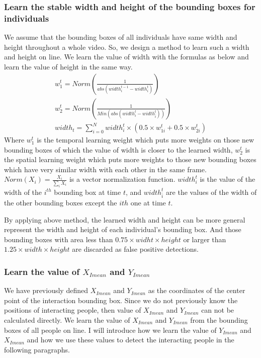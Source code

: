 \subsubsection*{Learn the stable width and height of the bounding boxes for individuals}
We assume that the bounding boxes of all individuals have same width and height throughout a whole video. So, we design a method to learn such a width and height on line. We learn the value of width with the formulas as below and learn the value of height in the same way. 
\begin{eqnarray}
	w_1^t = Norm\left(\frac{1}{abs(width_i^{t-1} - width_i^t)}\right) \\
	w_2^t = Norm\left(\frac{1}{Min(abs(width_i^t - width_{\bar i}^t))}    \right) \\
	width_t = \sum_{i=0}^N width_i^t \times (0.5 \times w_{1i}^t + 0.5 \times w_{2i}^t)
\end{eqnarray}
Where \(w_{1}^t\) is the temporal learning weight which puts more weights on those new bounding boxes of which the value of width is closer to the learned width, \(w_{2}^t\) is the spatial learning weight which puts more weights to those new bounding boxes which have very similar width with each other in the same frame. \(Norm(X_i) = \frac{X_i}{\sum_i X_i} \) is a vector normalization function. \(width_i^t\) is the value of the width of the \(i^{th}\) bounding box at time \(t\), and \(width_{\bar i}^t\) are the values of the width of the other bounding boxes except the \(ith\) one at time \(t\).  
\par 
By applying above method, the learned width and height can be more general represent the width and height of each individual's bounding box. And those bounding boxes with area less than \(0.75\times widht \times height \) or larger than \(1.25 \times width \times height\) are discarded as false positive detections. 

\subsubsection*{Learn the value of \(X_{Imean}\) and \(Y_{Imean}\)}
We have previously defined \(X_{Imean}\) and \(Y_{Imean}\) as the coordinates of the center point of the interaction bounding box. 	Since we do not previously know the positions of interacting people, then value of  \(X_{Imean}\) and \(Y_{Imean}\) can not be calculated directly. We learn the value of  \(X_{Imean}\) and \(Y_{Imean}\) from the bounding boxes of all people on line. I will introduce how we learn the value of \(Y_{Imean}\) and \(X_{Imean}\) and how we use these values to detect the interacting people in the following paragraphs.
 
